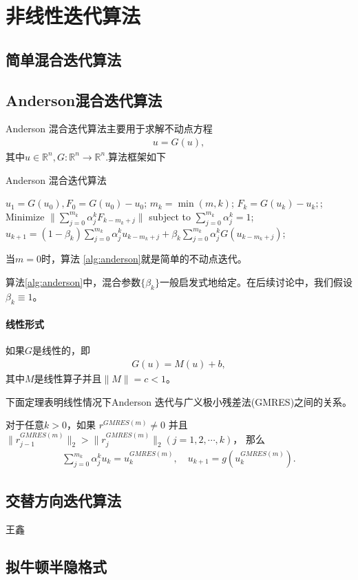 \section{非线性迭代算法}

\subsection{简单混合迭代算法}

\subsection{Anderson混合迭代算法}
Anderson 混合迭代算法主要用于求解不动点方程
	\begin{align*}
	u = G(u),
	\end{align*}
	其中$ u\in\mathbb{R}^n, G:\mathbb{R}^n\rightarrow \mathbb{R}^n. $算法框架如下
	\begin{algorithm}[!pbht]
		\caption{Anderson 混合迭代算法}
		\label{alg:anderson}
		\begin{algorithmic}[1]
			\STATE $ u_1 = G(u_0) , F_0 = G(u_0) - u_0$;
				\STATE $ m_k = \min(m, k) $;
				\STATE $ F_k = G(u_k) - u_k; $;
				\STATE Minimize $ \| \sum_{j=0}^{m_k}\alpha_j^kF_{k-m_k+j}\| $ subject to $ \sum_{j=0}^{m_k} \alpha^k_j = 1$;
				\STATE $u_{k+1}  = (1-\beta_k)\sum_{j=0}^{m_k}\alpha^k_ju_{k-m_k+j} + \beta_k\sum_{j=0}^{m_k}\alpha^k_jG(u_{k-m_k+j}) $;
			\ENDFOR			
		\end{algorithmic}
	\end{algorithm}
	\begin{remark}
		当$ m = 0 $时，算法 \ref{alg:anderson}就是简单的不动点迭代。
	\end{remark}
	\begin{remark}
		算法\ref{alg:anderson}中，混合参数$ \{\beta_k\} $一般启发式地给定。在后续讨论中，我们假设$ \beta_k\equiv 1 $。
	\end{remark}
\paragraph{线性形式} 如果$ G $是线性的，即
	\begin{align*}
	G(u) = M(u) + b ,
	\end{align*}
	其中$ M $是线性算子并且$ \|M\|=c<1 $。
    
    下面定理表明线性情况下Anderson 迭代与广义极小残差法(GMRES)之间的关系。
	\begin{lemma}
        对于任意$ k>0 $，如果 $ r^{GMRES(m)} \neq 0$ 并且$
        \|r_{j-1}^{GMRES(m)}\|_2> \|r_{j}^{GMRES(m)}\|_2 (j=1,2,\cdots,k)$， 那么
		\begin{align*}
            \sum_{j=0}^{m_k}\alpha^k_ju_k = u_k^{GMRES(m)},\quad u_{k+1} =
            g(u_k^{GMRES(m)}).
		\end{align*}
    \end{lemma}
\subsection{交替方向迭代算法}
{\color{red}\begin{center}
    王鑫
\end{center}}

\subsection{拟牛顿半隐格式}
